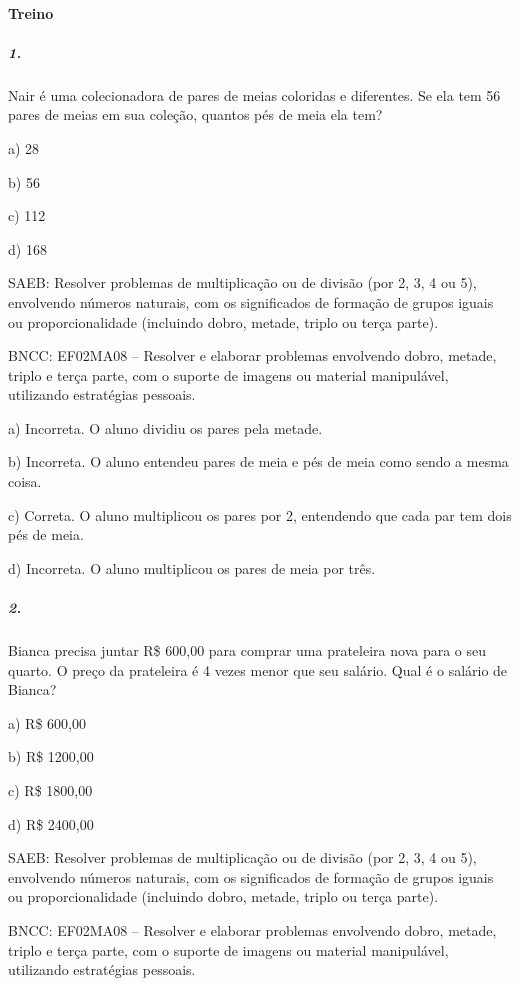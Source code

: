 \paragraph{Treino}\label{treino-7}

\subparagraph{1.}\label{section-97}

Nair é uma colecionadora de pares de meias coloridas e diferentes. Se
ela tem 56 pares de meias em sua coleção, quantos pés de meia ela tem?

a) 28

b) 56

c) 112

d) 168

SAEB: Resolver problemas de multiplicação ou de divisão (por 2,
3, 4 ou 5), envolvendo números naturais, com os significados de formação
de grupos iguais ou proporcionalidade (incluindo dobro, metade, triplo
ou terça parte).

BNCC: EF02MA08 -- Resolver e elaborar problemas envolvendo dobro, metade, triplo e terça parte,
com o suporte de imagens ou material manipulável, utilizando estratégias
pessoais.

a) Incorreta. O aluno dividiu os pares pela metade.

b) Incorreta. O aluno entendeu pares de meia e pés de meia como sendo a
mesma coisa.

c) Correta. O aluno multiplicou os pares por 2, entendendo que cada par
tem dois pés de meia.

d) Incorreta. O aluno multiplicou os pares de meia por três.

\subparagraph{2.}\label{section-98}

Bianca precisa juntar R\$ 600,00 para comprar uma prateleira nova para o
seu quarto. O preço da prateleira é 4 vezes menor que seu salário. Qual
é o salário de Bianca?

a) R\$ 600,00

b) R\$ 1200,00

c) R\$ 1800,00

d) R\$ 2400,00

SAEB: Resolver problemas de multiplicação ou de divisão (por 2,
3, 4 ou 5), envolvendo números naturais, com os significados de formação
de grupos iguais ou proporcionalidade (incluindo dobro, metade, triplo
ou terça parte).

BNCC: EF02MA08 -- Resolver e elaborar problemas envolvendo dobro, metade, triplo e terça parte,
com o suporte de imagens ou material manipulável, utilizando estratégias
pessoais.

